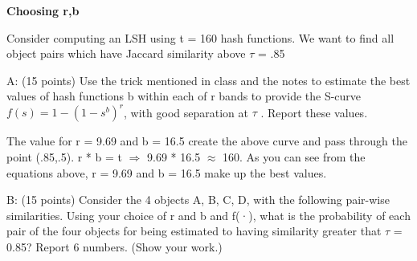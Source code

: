 \documentclass{report}
\begin{document}
 
  \begin{center}
 \textbf{Choosing r,b}
\end{center}

\begin{center}
Consider computing an LSH using t = 160 hash functions. We want to find all object pairs which have
Jaccard similarity above ${\tau}$ = .85
\end{center}

\begin{center}
A: (15 points) Use the trick mentioned in class and the notes to estimate the best values of hash functions
b within each of r bands to provide the S-curve ${f(s) = 1 - (1 - s^b)^r}$, with good separation at ${\tau}$ . Report these values.
\end{center}
 

\begin{center}
The value for r = 9.69 and b = 16.5 create the above curve and pass through the point (.85,.5). r * b = t ${\Rightarrow}$ 9.69 * 16.5 ${\approx}$ 160. As you can see from the equations above, r = 9.69 and b = 16.5 make up the best values.
\end{center}


\begin{center}
B: (15 points) Consider the 4 objects A, B, C, D, with the following pair-wise similarities. Using your choice of r and b and f(·), what is the probability of each pair of the four objects for being estimated to having similarity greater that ${\tau}$ = 0.85? Report 6 numbers. (Show your work.)
\end{center}
\end{document}
